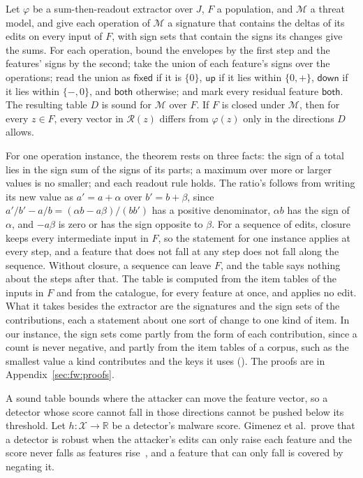 \label{thm:fw:directions}
{
Let $\varphi$ be a sum-then-readout extractor over $J$, $F$ a population, and $\mathcal{M}$ a threat model, and give
each operation of $\mathcal{M}$ a signature that contains the deltas of its edits on every input of $F$, with sign sets
that contain the signs its changes give the sums. For each operation, bound the envelopes by the first step and the
features' signs by the second; take the union of each feature's signs over the operations; read the union as
$\mathsf{fixed}$ if it is $\{0\}$, $\mathsf{up}$ if it lies within $\{0, +\}$, $\mathsf{down}$ if it lies within
$\{-, 0\}$, and $\mathsf{both}$ otherwise; and mark every residual feature $\mathsf{both}$. The resulting table $D$ is
sound for $\mathcal{M}$ over $F$. If $F$ is closed under $\mathcal{M}$, then for every $z \in F$, every vector in
$\mathcal{R}(z)$ differs from $\varphi(z)$ only in the directions $D$ allows.
}

\noindent For one operation instance, the theorem rests on three facts: the sign of a total lies in the sign sum of
the signs of its parts; a maximum over more or larger values is no smaller; and each readout rule holds. The ratio's
follows from writing its new value as $a' = a + \alpha$ over $b' = b + \beta$, since
$a'/b' - a/b = (\alpha b - a \beta)/(b b')$ has a positive denominator, $\alpha b$ has the sign of $\alpha$, and
$-a\beta$ is zero or has the sign opposite to $\beta$. For a sequence of edits, closure keeps every intermediate input
in $F$, so the statement for one instance applies at every step, and a feature that does not fall at any step does not
fall along the sequence. Without closure, a sequence can leave $F$, and the table says nothing about the steps after
that. The table is computed from the item tables of the inputs in $F$ and from the catalogue, for every feature at
once, and applies no edit. What it takes besides the extractor are the signatures and the sign sets of the
contributions, each a statement about one sort of change to one kind of item. In our instance, the sign sets come
partly from the form of each contribution, since a count is never negative, and partly from the item tables of a
corpus, such as the smallest value a kind contributes and the keys it uses (). The proofs are in
Appendix~\ref{sec:fw:proofs}.

A sound table bounds where the attacker can move the feature vector, so a detector whose score cannot fall in those
directions cannot be pushed below its threshold. Let $h: \mathcal{X} \to \mathbb{R}$ be a detector's malware score.
Gimenez et al.\ prove that a detector is robust when the attacker's edits can only raise each feature and the score
never falls as features rise~\cite{gimenez2025certifiably}, and a feature that can only fall is covered by negating
it.

